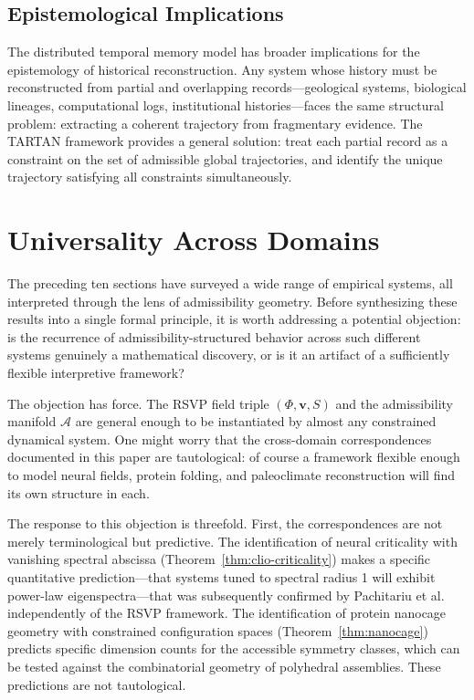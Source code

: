 \documentclass[11pt, oneside]{article}
\numberwithin{equation}{section}
\theoremstyle{rsvpstyle}
\theoremstyle{remark}
\newcommand{\vfield}{\mathbf{v}}
\newcommand{\Adm}{\mathcal{A}}
\begin{document}
\subsection{Epistemological Implications}

The distributed temporal memory model has broader implications for the epistemology of
historical reconstruction. Any system whose history must be reconstructed from partial
and overlapping records---geological systems, biological lineages, computational logs,
institutional histories---faces the same structural problem: extracting a coherent
trajectory from fragmentary evidence. The TARTAN framework provides a general solution:
treat each partial record as a constraint on the set of admissible global trajectories,
and identify the unique trajectory satisfying all constraints simultaneously.

\section{Universality Across Domains}
\label{sec:universality}

The preceding ten sections have surveyed a wide range of empirical systems, all
interpreted through the lens of admissibility geometry. Before synthesizing these
results into a single formal principle, it is worth addressing a potential objection:
is the recurrence of admissibility-structured behavior across such different systems
genuinely a mathematical discovery, or is it an artifact of a sufficiently flexible
interpretive framework?

The objection has force. The RSVP field triple $(\Phi, \vfield, S)$ and the
admissibility manifold $\Adm$ are general enough to be instantiated by almost any
constrained dynamical system. One might worry that the cross-domain correspondences
documented in this paper are tautological: of course a framework flexible enough to
model neural fields, protein folding, and paleoclimate reconstruction will find its
own structure in each.

The response to this objection is threefold. First, the correspondences are not
merely terminological but predictive. The identification of neural criticality with
vanishing spectral abscissa (Theorem~\ref{thm:clio-criticality}) makes a specific
quantitative prediction---that systems tuned to spectral radius 1 will exhibit
power-law eigenspectra---that was subsequently confirmed by Pachitariu et al.~\cite{Pachitariu2026Critical}
independently of the RSVP framework. The identification of protein nanocage geometry
with constrained configuration spaces (Theorem~\ref{thm:nanocage}) predicts specific
dimension counts for the accessible symmetry classes, which can be tested against the
combinatorial geometry of polyhedral assemblies. These predictions are not tautological.
\end{document}
